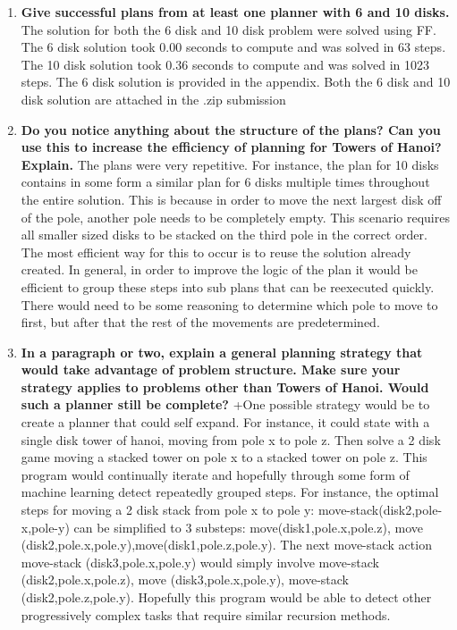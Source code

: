 \documentclass[12pt]{article}
\begin{document}
\begin{enumerate}
 \item \textbf{Give successful plans from at least one planner with 6 and 10 disks.} \newline The solution for both the 6 disk and 10 disk problem were solved using FF. The 6 disk solution took 0.00 seconds to compute and was solved in 63 steps. The 10 disk solution took 0.36 seconds to compute and was solved in 1023 steps. The 6 disk solution is provided in the appendix. Both the 6 disk and 10 disk solution are attached in the .zip submission
 \item \textbf{Do you notice anything about the structure of the plans? Can you use this to increase the
efficiency of planning for Towers of Hanoi? Explain.} \newline
   The plans were very repetitive. For instance, the plan for 10 disks contains in some form a similar plan for 6 disks multiple times throughout the entire solution. This is because in order to move the next largest disk off of the pole, another pole needs to be completely empty. This scenario requires all smaller sized disks to be stacked on the third pole in the correct order. The most efficient way for this to occur is to reuse the solution already created. In general, in order to improve the logic of the plan it would be efficient to group these steps into sub plans that can be reexecuted quickly. There would need to be some reasoning to determine which pole to move to first, but after that the rest of the movements are predetermined. 
 \item \textbf{In a paragraph or two, explain a general planning strategy that would take advantage of
problem structure. Make sure your strategy applies to problems other than Towers of Hanoi.
Would such a planner still be complete?}
+\newline One possible strategy would be to create a planner that could self expand. For instance, it could state with a single disk tower of hanoi, moving from pole x to pole z. Then solve a 2 disk game moving a stacked tower on pole x to a stacked tower on pole z. This program would continually iterate and hopefully through some form of machine learning detect repeatedly grouped steps. For instance, the optimal steps for moving a 2 disk stack from pole x to pole y: move-stack(disk2,pole-x,pole-y) can be simplified to 3 substeps: move(disk1,pole.x,pole.z), move (disk2,pole.x,pole.y),move(disk1,pole.z,pole.y). The next move-stack action \- move-stack (disk3,pole.x,pole.y) would simply involve \- move-stack (disk2,pole.x,pole.z), \- move (disk3,pole.x,pole.y), \- move-stack (disk2,pole.z,pole.y). Hopefully this program would be able to detect other progressively complex tasks that require similar recursion methods.
\end{enumerate}
\end{document}
